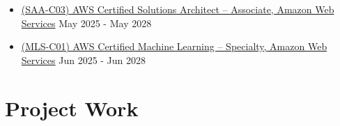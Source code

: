 \documentclass[letterpaper,11pt]{article}
\newcommand{\resumeItem}[1]{
  \item{\small{#1}}
}
\newcommand{\resumeItemListStart}{
\vspace{-1pt}
  \begin{itemize}[leftmargin=0.18in, label=\textbullet]
}
\newcommand{\resumeItemListEnd}{\end{itemize}}
\begin{document}
\resumeItemListStart

\resumeItem{
\href{\salink}{{(SAA-C03) AWS Certified Solutions Architect – Associate, Amazon Web Services}} 
\hfill{May 2025 - May 2028}}

\vspace{-5pt}
\resumeItem{
\href{\mllink}{{(MLS-C01) AWS Certified Machine Learning – Specialty, Amazon Web Services}} 
\hfill{Jun 2025 - Jun 2028}}


\resumeItemListEnd
\vspace{-18pt}







\section{Project Work}



\end{document}
